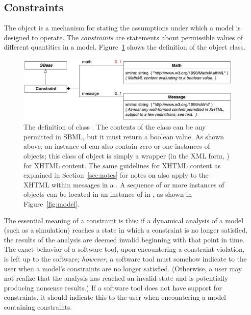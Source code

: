 \subsection{Constraints}
\label{sec:constraints}

The \Constraint object is a mechanism for stating the
assumptions under which a model is designed to operate.  The
\emph{constraints} are statements about permissible values of
different quantities in a model.  Figure~\ref{fig:constraint}
shows the definition of the \Constraint object class.

\begin{figure}[htb]
  \centering
  \small
  \vspace*{2ex}
  \includegraphics[scale=0.8]{figs/constraint-uml}
  \caption{The definition of class \Constraint.  The contents of
    the \Math class can be any \mathml permitted in SBML,
    but it must return a boolean value.  As shown above, an
    instance of \Constraint can also contain zero or one instances
    of \Message objects; this class of object is simply a wrapper
    (in the XML form, ) for
    XHTML content.  The same guidelines for XHTML content as
    explained in Section~\ref{sec:notes} for notes on \SBaseUpright also
    apply to the XHTML within messages in a \Constraint. A
    sequence of  or more instances of \Constraint objects can
    be located in an instance of \ListOfConstraints in \Model, as
    shown in Figure~\protect\ref{fig:model}.}
  \label{fig:constraint}
\end{figure}

The essential meaning of a constraint is this: if a dynamical
analysis of a model (such as a simulation) reaches a state in
which a constraint is no longer satisfied, the results of the
analysis are deemed invalid beginning with that point in time.
The exact behavior of a software tool, upon encountering a
constraint violation, is left up to the software; \emph{however},
a software tool must somehow indicate to the user when a model's
constraints are no longer satisfied.  (Otherwise, a user may not
realize that the analysis has reached an invalid state and is
potentially producing nonsense results.)  If a software tool does
not have support for constraints, it should indicate this to the
user when encountering a model containing constraints.


